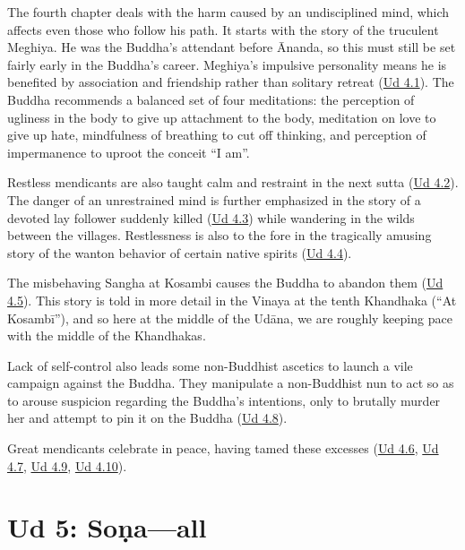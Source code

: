 \documentclass[12pt,openany]{book}%
\begin{document}
The fourth chapter deals with the harm caused by an undisciplined mind, which affects even those who follow his path. It starts with the story of the truculent Meghiya. He was the Buddha’s attendant before Ānanda, so this must still be set fairly early in the Buddha’s career. Meghiya’s impulsive personality means he is benefited by association and friendship rather than solitary retreat (\href{https://suttacentral.net/ud4.1/en/sujato}{Ud 4.1}). The Buddha recommends a balanced set of four meditations: the perception of ugliness in the body to give up attachment to the body, meditation on love to give up hate, mindfulness of breathing to cut off thinking, and perception of impermanence to uproot the conceit “I am”.

Restless mendicants are also taught calm and restraint in the next sutta (\href{https://suttacentral.net/ud4.2/en/sujato}{Ud 4.2}). The danger of an unrestrained mind is further emphasized in the story of a devoted lay follower suddenly killed (\href{https://suttacentral.net/ud4.3/en/sujato}{Ud 4.3}) while wandering in the wilds between the villages. Restlessness is also to the fore in the tragically amusing story of the wanton behavior of certain native spirits (\href{https://suttacentral.net/ud4.4/en/sujato}{Ud 4.4}). 

The misbehaving Sangha at Kosambi causes the Buddha to abandon them (\href{https://suttacentral.net/ud4.5/en/sujato}{Ud 4.5}). This story is told in more detail in the Vinaya at the tenth Khandhaka (“At \textsanskrit{Kosambī}”), and so here at the middle of the \textsanskrit{Udāna}, we are roughly keeping pace with the middle of the Khandhakas. 

Lack of self-control also leads some non-Buddhist ascetics to launch a vile campaign against the Buddha. They manipulate a non-Buddhist nun to act so as to arouse suspicion regarding the Buddha’s intentions, only to brutally murder her and attempt to pin it on the Buddha (\href{https://suttacentral.net/ud4.8/en/sujato}{Ud 4.8}). 

Great mendicants celebrate in peace, having tamed these excesses (\href{https://suttacentral.net/ud4.6/en/sujato}{Ud 4.6}, \href{https://suttacentral.net/ud4.7/en/sujato}{Ud 4.7}, \href{https://suttacentral.net/ud4.9/en/sujato}{Ud 4.9}, \href{https://suttacentral.net/ud4.10/en/sujato}{Ud 4.10}).

\section*{Ud 5: \textsanskrit{Soṇa}—all}
\end{document}
